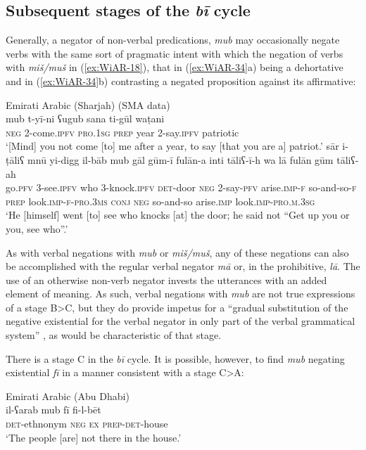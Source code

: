 \documentclass[output=paper,colorlinks,citecolor=brown]{langscibook}
\begin{document}
\subsection{Subsequent stages of the \textit{bī} cycle} \label{s:WiAR-4.6}

Generally, a negator of non-verbal predications, \textit{mub} may occasionally negate verbs with the same sort of pragmatic intent with which the negation of verbs with \textit{miš/muš} in (\ref{ex:WiAR-18}), that in (\ref{ex:WiAR-34}a) being a dehortative and in (\ref{ex:WiAR-34}b) contrasting a negated proposition against its affirmative:

\ea Emirati Arabic (Sharjah) (SMA data)\label{ex:WiAR-34}\\
  \ea
	\gll mub t-yī-ni ʕugub sana ti-gūl waṭani\\
	\textsc{neg} 2-come.\textsc{ipfv} \textsc{pro.1sg} \textsc{prep} year 2-say.\textsc{ipfv} patriotic\\
  	\glt ‘[Mind] you not come [to] me after a year, to say [that you are a] patriot.’
  \ex
  	\gll sār i-ṭāliʕ mnū yi-digg il-bāb mub gāl gūm-ī fulān-a inti tāliʕ-ī-h wa lā fulān gūm tāliʕ-ah\\
  	go.\textsc{pfv} 3-see.\textsc{ipfv} who 3-knock.\textsc{ipfv} \textsc{det}-door \textsc{neg} 2-say-\textsc{pfv} arise.\textsc{imp-f} so-and-so-\textsc{f} \textsc{prep} look.\textsc{imp-f-pro.3ms} \textsc{conj} \textsc{neg} so-and-so arise.\textsc{imp} look.\textsc{imp-pro.m.3sg}\\
  	\glt ‘He [himself] went [to] see who knocks [at] the door; he said not “Get up you or you, see who”.’
\z \z


As with verbal negations with \textit{mub} or \textit{miš/muš}, any of these negations can also be accomplished with the regular verbal negator \textit{mā} or, in the prohibitive, \textit{lā}. The use of an otherwise non-verb negator invests the utterances with an added element of meaning. As such, verbal negations with \textit{mub} are not true expressions of a stage B>C, but they do provide impetus for a “gradual substitution of the negative existential for the verbal negator in only part of the verbal grammatical system” \citep[10]{Croft1991}, as would be characteristic of that stage.

There is a stage C in the \textit{bī} cycle. It is possible, however, to find \textit{mub} negating existential \textit{fī} in a manner consistent with a stage C>A:

\ea Emirati Arabic (Abu Dhabi)\label{ex:WiAR-35}\\
	\gll il-ʕarab mub fī fi-l-bēt\\
	\textsc{det}-ethnonym \textsc{neg} \textsc{ex} \textsc{prep-det}-house\\
	\glt ‘The people [are] not there in the house.’ \citep[121]{al-rawi1990a}
\z
\end{document}
